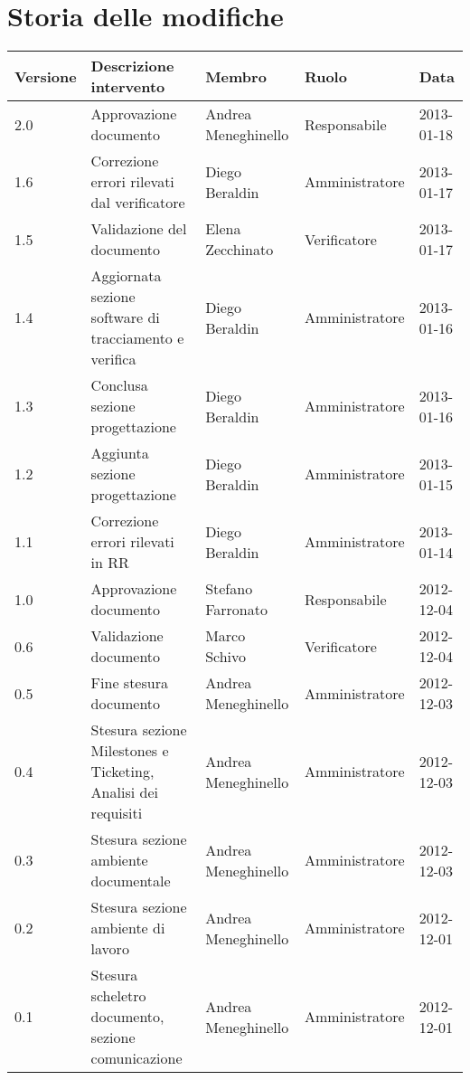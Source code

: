 \section*{Storia delle modifiche}
\begin{tabularx}{\textwidth}{lXlll}
\toprule
Versione & Descrizione intervento & Membro & Ruolo & Data\\
\midrule %
2.0 & Approvazione documento & Andrea Meneghinello & Responsabile & 2013-01-18\\
1.6 & Correzione errori rilevati dal verificatore & Diego Beraldin & Amministratore & 2013-01-17\\
1.5 & Validazione del documento & Elena Zecchinato & Verificatore & 2013-01-17\\
1.4 & Aggiornata sezione software di tracciamento e verifica & Diego Beraldin & Amministratore & 2013-01-16\\
1.3 & Conclusa sezione progettazione & Diego Beraldin & Amministratore & 2013-01-16\\
1.2 & Aggiunta sezione progettazione & Diego Beraldin & Amministratore & 2013-01-15\\
1.1 & Correzione errori rilevati in RR & Diego Beraldin & Amministratore & 2013-01-14\\
1.0 & Approvazione documento & Stefano Farronato & Responsabile & 2012-12-04\\
0.6 & Validazione documento & Marco Schivo & Verificatore & 2012-12-04\\
0.5 & Fine stesura documento & Andrea Meneghinello & Amministratore & 2012-12-03\\
0.4 & Stesura sezione Milestones e Ticketing, Analisi dei requisiti & Andrea Meneghinello & Amministratore & 2012-12-03\\
0.3 & Stesura sezione ambiente documentale & Andrea Meneghinello & Amministratore & 2012-12-03\\
0.2 & Stesura sezione ambiente di lavoro & Andrea Meneghinello & Amministratore & 2012-12-01\\
0.1 & Stesura scheletro documento, sezione comunicazione & Andrea Meneghinello & Amministratore & 2012-12-01\\
\bottomrule
\end{tabularx}
\newpage



\setcounter{page}{1}
\pagestyle{normal}

